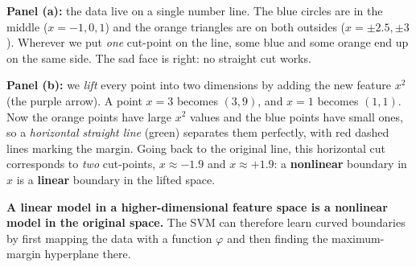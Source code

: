 \begin{explain}
\textbf{Panel (a):} the data live on a single number line. The blue circles are in the middle ($x=-1,0,1$) and the orange triangles are on both outsides ($x=\pm2.5,\pm3$). Wherever we put \emph{one} cut-point on the line, some blue and some orange end up on the same side. The sad face is right: no straight cut works.

\medskip
\textbf{Panel (b):} we \emph{lift} every point into two dimensions by adding the new feature $x^2$ (the purple arrow). A point $x=3$ becomes $(3,9)$, and $x=1$ becomes $(1,1)$. Now the orange points have large $x^2$ values and the blue points have small ones, so a \emph{horizontal straight line} (green) separates them perfectly, with red dashed lines marking the margin. Going back to the original line, this horizontal cut corresponds to \emph{two} cut-points, $x\approx-1.9$ and $x\approx+1.9$: a \textbf{nonlinear} boundary in $x$ is a \textbf{linear} boundary in the lifted space.
\end{explain}

\begin{keyidea}
\textbf{A linear model in a higher-dimensional feature space is a nonlinear model in the original space.} The SVM can therefore learn curved boundaries by first mapping the data with a function $\varphi$ and then finding the maximum-margin hyperplane there.
\end{keyidea}

